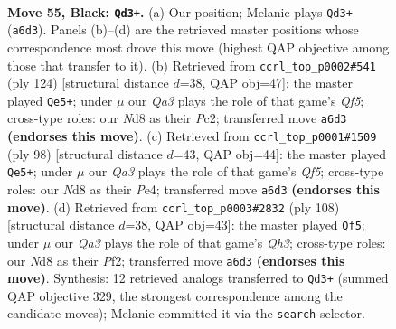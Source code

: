 \documentclass[11pt]{article}
\begin{document}
\clearpage

\begin{figure}[p]\centering
\begin{subfigure}{0.46\textwidth}\centering
\resizebox{\linewidth}{!}{%
\newchessgame
\chessboard[
  setfen={2kn2Q1/p1p3p1/qp4p1/2p5/8/2P5/1P6/1K6 b - - 11 55},
  showmover=false,
  pgfstyle=straightmove, color=movearrow, markmove={a6-d3}
]}
\caption{}
\end{subfigure}\hfill
\begin{subfigure}{0.46\textwidth}\centering
\resizebox{\linewidth}{!}{%
\newchessgame
\chessboard[
  setfen={1k6/1p6/p6p/P4Q2/1P4P1/1K6/2P5/3q4 w - - 19 63},
  showmover=false,
  pgfstyle=straightmove, color=movearrow, markmove={f5-e5}
]}
\caption{}
\end{subfigure}
\\[4pt]
\begin{subfigure}{0.46\textwidth}\centering
\resizebox{\linewidth}{!}{%
\newchessgame
\chessboard[
  setfen={8/4k1p1/7p/5Q2/4P3/p2q3P/5PPK/8 w - - 6 50},
  showmover=false,
  pgfstyle=straightmove, color=movearrow, markmove={f5-e5}
]}
\caption{}
\end{subfigure}\hfill
\begin{subfigure}{0.46\textwidth}\centering
\resizebox{\linewidth}{!}{%
\newchessgame
\chessboard[
  setfen={8/5pk1/8/6p1/4p3/4P1PQ/4qPPK/8 w - - 4 55},
  showmover=false,
  pgfstyle=straightmove, color=movearrow, markmove={h3-f5}
]}
\caption{}
\end{subfigure}
\caption{\textbf{Move 55, Black: \texttt{Qd3+}.} (a) Our position; Melanie plays \texttt{Qd3+} (\texttt{a6d3}). Panels (b)--(d) are the retrieved master positions whose correspondence most drove this move (highest QAP objective among those that transfer to it). (b) Retrieved from \texttt{ccrl\_top\_p0002\#541} (ply 124) [structural distance $d$=38, QAP obj=47]: the master played \texttt{Qe5+}; under $\mu$ our \emph{Qa3} plays the role of that game's \emph{Qf5}; cross-type roles: our \emph{N}d8 as their \emph{P}c2; transferred move \texttt{a6d3} \textbf{(endorses this move)}. (c) Retrieved from \texttt{ccrl\_top\_p0001\#1509} (ply 98) [structural distance $d$=43, QAP obj=44]: the master played \texttt{Qe5+}; under $\mu$ our \emph{Qa3} plays the role of that game's \emph{Qf5}; cross-type roles: our \emph{N}d8 as their \emph{P}e4; transferred move \texttt{a6d3} \textbf{(endorses this move)}. (d) Retrieved from \texttt{ccrl\_top\_p0003\#2832} (ply 108) [structural distance $d$=38, QAP obj=43]: the master played \texttt{Qf5}; under $\mu$ our \emph{Qa3} plays the role of that game's \emph{Qh3}; cross-type roles: our \emph{N}d8 as their \emph{P}f2; transferred move \texttt{a6d3} \textbf{(endorses this move)}. Synthesis: 12 retrieved analogs transferred to \texttt{Qd3+} (summed QAP objective 329, the strongest correspondence among the candidate moves); Melanie committed it via the \texttt{search} selector.}
\label{fig:thought-m109}
\end{figure}
\end{document}
